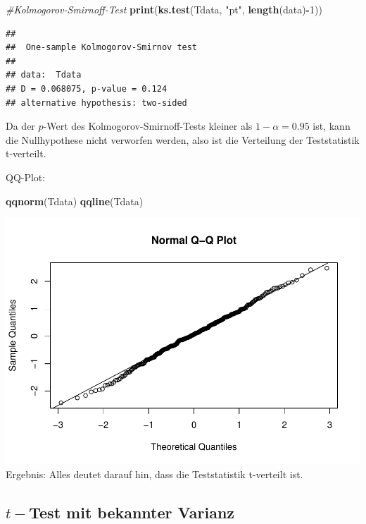 \documentclass[]{article}
\newenvironment{Shaded}{\begin{snugshade}}{\end{snugshade}}
\newcommand{\CommentTok}[1]{\textcolor[rgb]{0.56,0.35,0.01}{\textit{#1}}}
\newcommand{\DecValTok}[1]{\textcolor[rgb]{0.00,0.00,0.81}{#1}}
\newcommand{\KeywordTok}[1]{\textcolor[rgb]{0.13,0.29,0.53}{\textbf{#1}}}
\newcommand{\NormalTok}[1]{#1}
\newcommand{\OperatorTok}[1]{\textcolor[rgb]{0.81,0.36,0.00}{\textbf{#1}}}
\newcommand{\StringTok}[1]{\textcolor[rgb]{0.31,0.60,0.02}{#1}}
\begin{document}
\begin{Shaded}
\begin{Highlighting}[]
\CommentTok{#Kolmogorov-Smirnoff-Test}
\KeywordTok{print}\NormalTok{(}\KeywordTok{ks.test}\NormalTok{(Tdata, }\StringTok{"pt"}\NormalTok{, }\KeywordTok{length}\NormalTok{(data)}\OperatorTok{-}\DecValTok{1}\NormalTok{))}
\end{Highlighting}
\end{Shaded}

\begin{verbatim}
## 
##  One-sample Kolmogorov-Smirnov test
## 
## data:  Tdata
## D = 0.068075, p-value = 0.124
## alternative hypothesis: two-sided
\end{verbatim}

Da der \(p\)-Wert des Kolmogorov-Smirnoff-Tests kleiner als \(1-\alpha=0.95\) ist, kann die Nullhypothese nicht verworfen werden,
also ist die Verteilung der Teststatistik t-verteilt.

QQ-Plot:

\begin{Shaded}
\begin{Highlighting}[]
\KeywordTok{qqnorm}\NormalTok{(Tdata)}
\KeywordTok{qqline}\NormalTok{(Tdata)}
\end{Highlighting}
\end{Shaded}

\includegraphics{Test_files/figure-latex/unnamed-chunk-6-1.pdf}
Ergebnis: Alles deutet darauf hin, dass die Teststatistik t-verteilt ist.

\hypertarget{t-test-mit-bekannter-varianz}{%
\subsection{\texorpdfstring{\(t-\)Test mit bekannter Varianz}{t-Test mit bekannter Varianz}}\label{t-test-mit-bekannter-varianz}}
\end{document}

